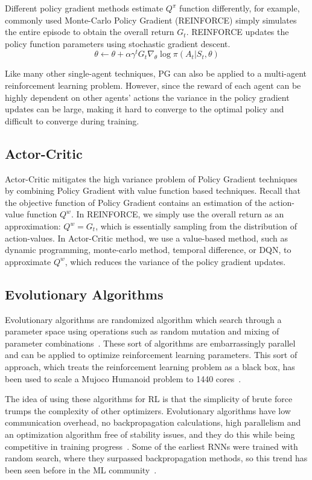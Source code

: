 Different policy gradient methods estimate $Q^\pi$ function differently, for
example, commonly used Monte-Carlo Policy Gradient (REINFORCE) simply
simulates the entire episode to obtain the overall return $G_t$. REINFORCE
updates the policy function parameters using stochastic gradient descent.
\begin{equation}
\theta \leftarrow \theta
	+ \alpha \gamma^t G_t \nabla_\theta \log \pi (A_t|S_t, \theta)
\end{equation}

Like many other single-agent techniques, PG can also be applied to a
multi-agent reinforcement learning problem. However, since the reward of each
agent can be highly dependent on other agents' actions the variance in the
policy gradient updates can be large, making it hard to converge to the
optimal policy and difficult to converge during training.


\subsection{Actor-Critic}

Actor-Critic mitigates the high variance problem of Policy Gradient techniques
by combining Policy Gradient with value function based techniques. Recall that
the objective function of Policy Gradient contains an estimation of the
action-value function $Q^w$. In REINFORCE, we simply use the overall return as
an approximation: $Q^w = G_t$, which is essentially sampling from the
distribution of action-values. In Actor-Critic method, we use a value-based
method, such as dynamic programming, monte-carlo method, temporal difference,
or DQN, to approximate $Q^w$, which reduces the variance of the policy
gradient updates.


\subsection{Evolutionary Algorithms}

Evolutionary algorithms are randomized algorithm which search through a
parameter space using operations such as random mutation and mixing of
parameter combinations~\cite{man1996genetic}. These sort of algorithms are
embarrassingly parallel and can be applied to optimize reinforcement learning
parameters. This sort of approach, which treats the reinforcement learning
problem as a black box, has been used to scale a Mujoco Humanoid problem to
1440 cores~\cite{salimans2017evolution}.

The idea of using these algorithms for RL is that the simplicity of brute
force trumps the complexity of other optimizers. Evolutionary algorithms have
low communication overhead, no backpropagation calculations, high parallelism
and an optimization algorithm free of stability issues, and they do this while
being competitive in training progress~\cite{salimans2017evolution}. Some of
the earliest RNNs were trained with random search, where they surpassed
backpropagation methods, so this trend has been seen before in the ML
community~\cite{hochreiter1997long}.

